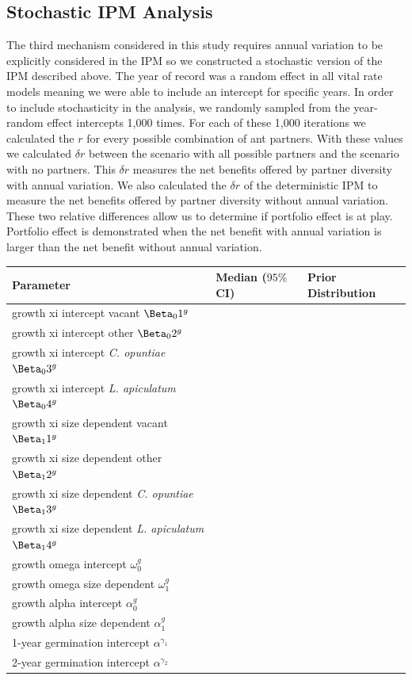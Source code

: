 \documentclass[12pt,a4paper]{article}
\begin{document}
\subsection*{Stochastic IPM Analysis}
The third mechanism considered in this study requires annual variation to be explicitly considered in the IPM so we constructed a stochastic version of the IPM described above. 
The year of record was a random effect in all vital rate models meaning we were able to include an intercept for specific years. 
In order to include stochasticity in the analysis, we randomly sampled from the year-random effect intercepts 1,000 times.
For each of these 1,000 iterations we calculated the $r$ for every possible combination of ant partners. 
With these values we calculated $\delta r$ between the scenario with all possible partners and the scenario with no partners.
This $\delta r$ measures the net benefits offered by partner diversity with annual variation.
We also calculated the $\delta r$ of the deterministic IPM to measure the net benefits offered by partner diversity without annual variation. 
These two relative differences allow us to determine if portfolio effect is at play.
Portfolio effect is demonstrated when the net benefit with annual variation is larger than the net benefit without annual variation. 
		
\begin{table}[]
\begin{tabular}{l|l|l}
\textbf{Parameter} & \textbf{Median ($95\%$ CI)} & \textbf{Prior Distribution} \\
\hline
growth xi intercept vacant $\Beta_01^g$ & & \\
growth xi intercept other $\Beta_02^g$ & & \\
growth xi intercept \textit{C. opuntiae} $\Beta_03^g$ & & \\
growth xi intercept \textit{L. apiculatum} $\Beta_04^g$ & & \\
growth xi size dependent vacant $\Beta_11^g$ & & \\
growth xi size dependent other $\Beta_12^g$ & & \\
growth xi size dependent \textit{C. opuntiae} $\Beta_13^g$ & & \\
growth xi size dependent \textit{L. apiculatum} $\Beta_14^g$ & & \\
growth omega intercept $\omega_0^g$ & & \\
growth omega size dependent $\omega_1^g$ & & \\
growth alpha intercept $\alpha_0^g$ & & \\
growth alpha size dependent $\alpha_1^g$ & & \\
1-year germination intercept $\alpha^{\gamma_1}$ & & \\
2-year germination intercept $\alpha^{\gamma_2}$ & & \\

\end{tabular}
\end{table}
		
\end{document}
